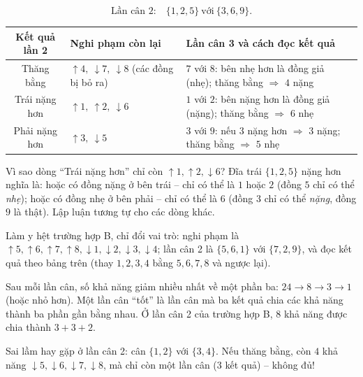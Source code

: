 {\[ \text{Lần cân 2:}\quad \{1, 2, 5\} \ \text{với}\ \{3, 6, 9\}. \]
\begin{center}\footnotesize
\begin{tabular}{|c|p{3.6cm}|p{6.4cm}|}
\hline
\rowcolor{tmBlue!10} Kết quả lần 2 & Nghi phạm còn lại & Lần cân 3 và cách đọc kết quả\\ \hline
Thăng bằng & $\uparrow 4,\ \downarrow 7,\ \downarrow 8$ (các đồng bị bỏ ra) & $7$ với $8$: bên nhẹ hơn là đồng giả (nhẹ);
thăng bằng $\Rightarrow$ $4$ nặng\\ \hline
Trái nặng hơn & $\uparrow 1,\ \uparrow 2,\ \downarrow 6$ & $1$ với $2$: bên nặng hơn là đồng giả (nặng); thăng bằng
$\Rightarrow$ $6$ nhẹ\\ \hline
Phải nặng hơn & $\uparrow 3,\ \downarrow 5$ & $3$ với $9$: nếu $3$ nặng hơn $\Rightarrow$ $3$ nặng; thăng bằng
$\Rightarrow$ $5$ nhẹ\\ \hline
\end{tabular}
\end{center}
\begin{proofbox}Vì sao dòng ``Trái nặng hơn'' chỉ còn $\uparrow 1, \uparrow 2, \downarrow 6$? Đĩa trái $\{1, 2, 5\}$ nặng hơn nghĩa
là: hoặc có đồng nặng ở bên trái -- chỉ có thể là $1$ hoặc $2$ (đồng $5$ chỉ có thể \emph{nhẹ}); hoặc có đồng nhẹ ở bên phải --
chỉ có thể là $6$ (đồng $3$ chỉ có thể \emph{nặng}, đồng $9$ là thật). Lập luận tương tự cho các dòng khác.\end{proofbox}
Làm y hệt trường hợp B, chỉ đổi vai trò: nghi phạm là $\uparrow 5, \uparrow 6, \uparrow 7, \uparrow 8, \downarrow 1, \downarrow 2,
\downarrow 3, \downarrow 4$; lần cân 2 là $\{5, 6, 1\}$ với $\{7, 2, 9\}$, và đọc kết quả theo bảng trên (thay $1, 2, 3, 4$ bằng
$5, 6, 7, 8$ và ngược lại).
\begin{tipbox}Sau mỗi lần cân, số khả năng giảm nhiều nhất về một phần ba: $24 \to 8 \to 3 \to 1$ (hoặc nhỏ hơn). Một lần cân
``tốt'' là lần cân mà ba kết quả chia các khả năng thành ba phần gần bằng nhau. Ở lần cân 2 của trường hợp B, $8$ khả năng được chia
thành $3 + 3 + 2$.\end{tipbox}
\begin{warnbox}Sai lầm hay gặp ở lần cân 2: cân $\{1, 2\}$ với $\{3, 4\}$. Nếu thăng bằng, còn $4$ khả năng
$\downarrow 5, \downarrow 6, \downarrow 7, \downarrow 8$, mà chỉ còn một lần cân ($3$ kết quả) -- không đủ!\end{warnbox}
}


